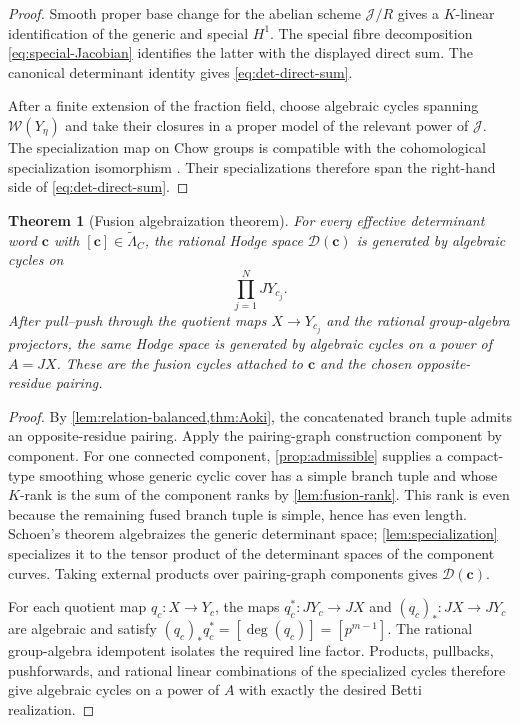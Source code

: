 \documentclass[11pt]{article}
\newtheorem{theorem}{Theorem}[section]
\theoremstyle{definition}
\theoremstyle{remark}
\begin{document}
\begin{proof}
Smooth proper base change for the abelian scheme $\mathcal J/R$ gives a $K$-linear identification of the generic and special $H^1$.  The special fibre decomposition \eqref{eq:special-Jacobian} identifies the latter with the displayed direct sum.  The canonical determinant identity gives \eqref{eq:det-direct-sum}.

After a finite extension of the fraction field, choose algebraic cycles spanning $\mathcal W(Y_\eta)$ and take their closures in a proper model of the relevant power of $\mathcal J$.  The specialization map on Chow groups is compatible with the cohomological specialization isomorphism \cite{Fulton,SGA6}.  Their specializations therefore span the right-hand side of \eqref{eq:det-direct-sum}.
\end{proof}

\begin{theorem}[Fusion algebraization theorem]\label{thm:fusion}
For every effective determinant word $\mathbf c$ with
$[\mathbf c]\in\widetilde\Lambda_C$, the rational Hodge space
$\mathcal D(\mathbf c)$ is generated by algebraic cycles on
\[
 \prod_{j=1}^N JY_{c_j}.
\]
After pull--push through the quotient maps $X\to Y_{c_j}$ and the rational group-algebra projectors, the same Hodge space is generated by algebraic cycles on a power of $A=JX$.  These are the \emph{fusion cycles} attached to $\mathbf c$ and the chosen opposite-residue pairing.
\end{theorem}

\begin{proof}
By \cref{lem:relation-balanced,thm:Aoki}, the concatenated branch tuple admits an opposite-residue pairing.  Apply the pairing-graph construction component by component.  For one connected component, \cref{prop:admissible} supplies a compact-type smoothing whose generic cyclic cover has a simple branch tuple and whose $K$-rank is the sum of the component ranks by \cref{lem:fusion-rank}.  This rank is even because the remaining fused branch tuple is simple, hence has even length.  Schoen's theorem algebraizes the generic determinant space; \cref{lem:specialization} specializes it to the tensor product of the determinant spaces of the component curves.  Taking external products over pairing-graph components gives $\mathcal D(\mathbf c)$.

For each quotient map $q_c:X\to Y_c$, the maps $q_c^*:JY_c\to JX$ and $(q_c)_*:JX\to JY_c$ are algebraic and satisfy $(q_c)_*q_c^*=[\deg(q_c)]=[p^{m-1}]$.  The rational group-algebra idempotent isolates the required line factor.  Products, pullbacks, pushforwards, and rational linear combinations of the specialized cycles therefore give algebraic cycles on a power of $A$ with exactly the desired Betti realization.
\end{proof}
\end{document}

